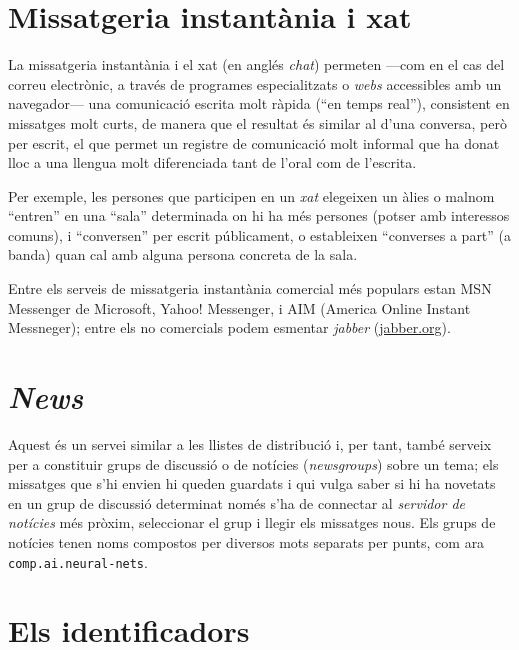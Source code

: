 
\section{Missatgeria instantània i xat}

La missatgeria instantània i el xat (en anglés \emph{chat}) permeten
---com en el cas del correu electrònic, a través de programes
especialitzats o \emph{webs} accessibles amb un navegador--- una
comunicació escrita molt ràpida (``en temps real''), consistent en
missatges molt curts, de manera que el resultat és similar al d'una
conversa, però per escrit, el que permet un registre de comunicació
molt informal que ha donat lloc a una llengua molt diferenciada tant
de l'oral com de l'escrita. 

Per exemple, les persones que participen en un \emph{xat} elegeixen un àlies o
malnom ``entren'' en una ``sala'' determinada on hi ha més persones
(potser amb interessos comuns), i ``conversen'' per escrit
públicament, o estableixen ``converses a part'' (a banda) quan cal amb
alguna persona concreta de la sala.

Entre els serveis de missatgeria instantània comercial més populars estan MSN
Messenger de Microsoft, Yahoo! Messenger, i AIM (America Online Instant
Messneger); entre els no comercials podem esmentar \emph{jabber}
(\url{jabber.org}).


\section{\emph{News}}

Aquest és un servei similar a les llistes de
distribució i, per tant, també serveix per a constituir grups
de discussió o de notícies (\emph{newsgroups}) sobre un tema;
els missatges que s'hi envien hi queden guardats i qui vulga saber
si hi ha novetats en un grup de discussió determinat només s'ha
de connectar al \emph{servidor de notícies} més pròxim,
seleccionar el grup i llegir els missatges nous. Els grups de
notícies tenen noms compostos per diversos mots separats per punts,
com ara {\tt comp.ai.neural-nets}.




\section{Els identificadors}


